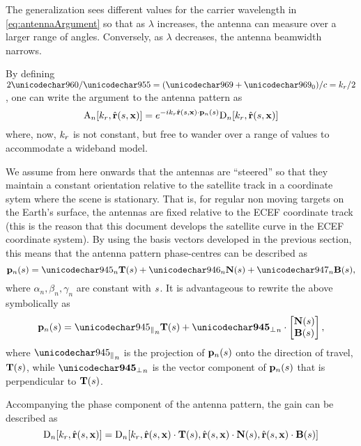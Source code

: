 The  generalization sees different values for the carrier wavelength in \eqref{eq:antennaArgument} so that as $\lambda$ increases, the antenna can measure over a larger range of angles. Conversely, as $\lambda$ decreases, the antenna beamwidth narrows.
\par
By defining $2\pi/\lambda=(\omega+\omega_0)/c=\kr/2$, one can write the argument to the antenna pattern as
\begin{equation}
\pattern{\channelIndex}[\kr, \uRangeVectorParm]=\eex{-\im\kr\uRangeVectorParm\cdot\pAntennaParm{\channelIndex}}\dPattern{\channelIndex}[\kr, \uRangeVectorParm]
\label{eq:antennaArgument2}
\end{equation}
where, now, $k_r$ is not constant, but free to wander over a range of values to accommodate a \gls{wideband} model.
\par
We assume from here onwards that the antennas are ``steered'' so that they maintain a constant orientation relative to the satellite track in a coordinate sytem where the scene is stationary. That is, for regular non moving targets on the Earth's surface, the antennas are fixed relative to the ECEF coordinate track (this is the reason that this document develops the satellite curve in the ECEF coordinate system). By using the basis vectors developed in the previous section, this means that the antenna pattern phase-centres can be described as
\begin{equation}
 \pAntennaParm{\channelIndex} = \alpha_n\vct{T}(\parm) + \beta_n\vct{N}(\parm) + \gamma_n\vct{B}(\parm),
\end{equation}
where $\alpha_n, \beta_n, \gamma_n$ are constant with $s$. It is advantageous to rewrite the above symbolically as
\begin{equation}
 \pAntennaParm{\channelIndex} = \alongtrack\vct{T}(\parm) + \acrosstrack\cdot\begin{bmatrix}\vct{N}(\parm)\\\vct{B}(\parm)\end{bmatrix},
 \label{eq:spaceDiversityCurve}
\end{equation}
where $\alongtrack$ is the projection of $\mathbf{p}_{n}(s)$ onto the direction of travel, $\mathbf{T}(s)$, while $\acrosstrack$ is the vector component of $\mathbf{p}_{n}(s)$ that is perpendicular to $\mathbf{T}(s)$.
\par
Accompanying the phase component of the antenna pattern, the gain can be described as
\begin{equation}
 \dPattern{\channelIndex}[\kr, \uRangeVectorParm] = \dPattern{\channelIndex}[\kr, \uRangeVectorParm\cdot\vct{T}(\parm), \uRangeVectorParm\cdot\vct{N}(\parm), \uRangeVectorParm\cdot\vct{B}(\parm)]
 \label{eq:antennaDiversityCurve}
\end{equation}
